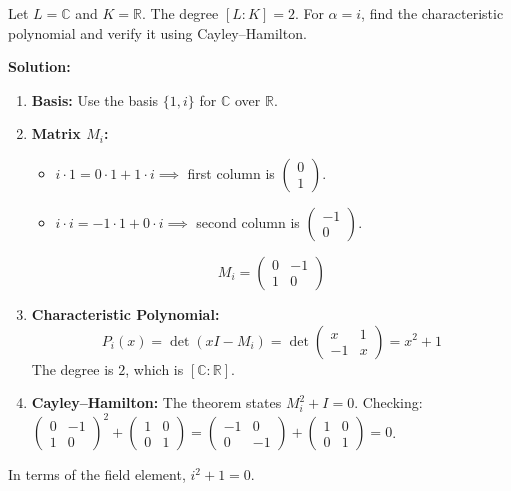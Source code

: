 \begin{example}
Let $L = \mathbb{C}$ and $K = \mathbb{R}$. The degree $[L:K] = 2$. For $\alpha = i$, find the characteristic polynomial and verify it using Cayley--Hamilton.

\textbf{Solution:}
\begin{enumerate}
    \item \textbf{Basis:} Use the basis $\{1, i\}$ for $\mathbb{C}$ over $\mathbb{R}$.
    \item \textbf{Matrix $M_i$:}
    \begin{itemize}
        \item $i \cdot 1 = 0 \cdot 1 + 1 \cdot i \implies$ first column is $\begin{pmatrix} 0 \\ 1 \end{pmatrix}$.
        \item $i \cdot i = -1 \cdot 1 + 0 \cdot i \implies$ second column is $\begin{pmatrix} -1 \\ 0 \end{pmatrix}$.
    \end{itemize}
    \[ M_i = \begin{pmatrix} 0 & -1 \\ 1 & 0 \end{pmatrix} \]
    \item \textbf{Characteristic Polynomial:}
    \[ P_i(x) = \det(xI - M_i) = \det \begin{pmatrix} x & 1 \\ -1 & x \end{pmatrix} = x^2 + 1 \]
    The degree is $2$, which is $[ \mathbb{C} : \mathbb{R} ]$.
    \item \textbf{Cayley--Hamilton:}
    The theorem states $M_i^2 + I = 0$. 
    Checking: $\begin{pmatrix} 0 & -1 \\ 1 & 0 \end{pmatrix}^2 + \begin{pmatrix} 1 & 0 \\ 0 & 1 \end{pmatrix} = \begin{pmatrix} -1 & 0 \\ 0 & -1 \end{pmatrix} + \begin{pmatrix} 1 & 0 \\ 0 & 1 \end{pmatrix} = 0$.
\end{enumerate}
   In terms of the field element, $i^2 + 1 = 0$.
\end{example}
